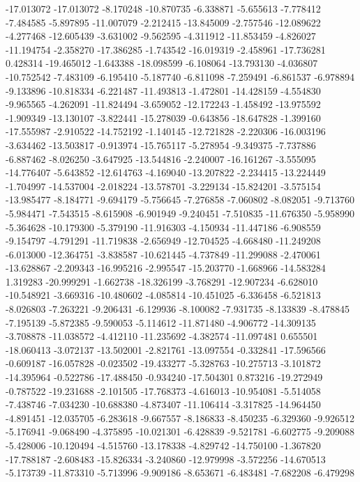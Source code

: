 -17.013072
-17.013072
-8.170248
-10.870735
-6.338871
-5.655613
-7.778412
-7.484585
-5.897895
-11.007079
-2.212415
-13.845009
-2.757546
-12.089622
-4.277468
-12.605439
-3.631002
-9.562595
-4.311912
-11.853459
-4.826027
-11.194754
-2.358270
-17.386285
-1.743542
-16.019319
-2.458961
-17.736281
0.428314
-19.465012
-1.643388
-18.098599
-6.108064
-13.793130
-4.036807
-10.752542
-7.483109
-6.195410
-5.187740
-6.811098
-7.259491
-6.861537
-6.978894
-9.133896
-10.818334
-6.221487
-11.493813
-1.472801
-14.428159
-4.554830
-9.965565
-4.262091
-11.824494
-3.659052
-12.172243
-1.458492
-13.975592
-1.909349
-13.130107
-3.822441
-15.278039
-0.643856
-18.647828
-1.399160
-17.555987
-2.910522
-14.752192
-1.140145
-12.721828
-2.220306
-16.003196
-3.634462
-13.503817
-0.913974
-15.765117
-5.278954
-9.349375
-7.737886
-6.887462
-8.026250
-3.647925
-13.544816
-2.240007
-16.161267
-3.555095
-14.776407
-5.643852
-12.614763
-4.169040
-13.207822
-2.234415
-13.224449
-1.704997
-14.537004
-2.018224
-13.578701
-3.229134
-15.824201
-3.575154
-13.985477
-8.184771
-9.694179
-5.756645
-7.276858
-7.060802
-8.082051
-9.713760
-5.984471
-7.543515
-8.615908
-6.901949
-9.240451
-7.510835
-11.676350
-5.958990
-5.364628
-10.179300
-5.379190
-11.916303
-4.150934
-11.447186
-6.908559
-9.154797
-4.791291
-11.719838
-2.656949
-12.704525
-4.668480
-11.249208
-6.013000
-12.364751
-3.838587
-10.621445
-4.737849
-11.299088
-2.470061
-13.628867
-2.209343
-16.995216
-2.995547
-15.203770
-1.668966
-14.583284
1.319283
-20.999291
-1.662738
-18.326199
-3.768291
-12.907234
-6.628010
-10.548921
-3.669316
-10.480602
-4.085814
-10.451025
-6.336458
-6.521813
-8.026803
-7.263221
-9.206431
-6.129936
-8.100082
-7.931735
-8.133839
-8.478845
-7.195139
-5.872385
-9.590053
-5.114612
-11.871480
-4.906772
-14.309135
-3.708878
-11.038572
-4.412110
-11.235692
-4.382574
-11.097481
0.655501
-18.060413
-3.072137
-13.502001
-2.821761
-13.097554
-0.332841
-17.596566
-0.609187
-16.057828
-0.023502
-19.433277
-5.328763
-10.275713
-3.101872
-14.395964
-0.522786
-17.488450
-0.934240
-17.504301
0.873216
-19.272949
-0.787522
-19.231688
-2.101505
-17.768373
-4.616013
-10.954081
-5.514058
-7.438746
-7.034230
-10.688380
-4.873407
-11.106414
-3.317825
-14.964450
-4.891451
-12.035705
-6.283618
-9.667557
-8.186833
-8.450235
-6.329360
-9.926512
-5.176941
-9.068490
-4.375895
-10.021301
-6.428839
-9.521781
-6.602775
-9.209088
-5.428006
-10.120494
-4.515760
-13.178338
-4.829742
-14.750100
-1.367820
-17.788187
-2.608483
-15.826334
-3.240860
-12.979998
-3.572256
-14.670513
-5.173739
-11.873310
-5.713996
-9.909186
-8.653671
-6.483481
-7.682208
-6.479298
